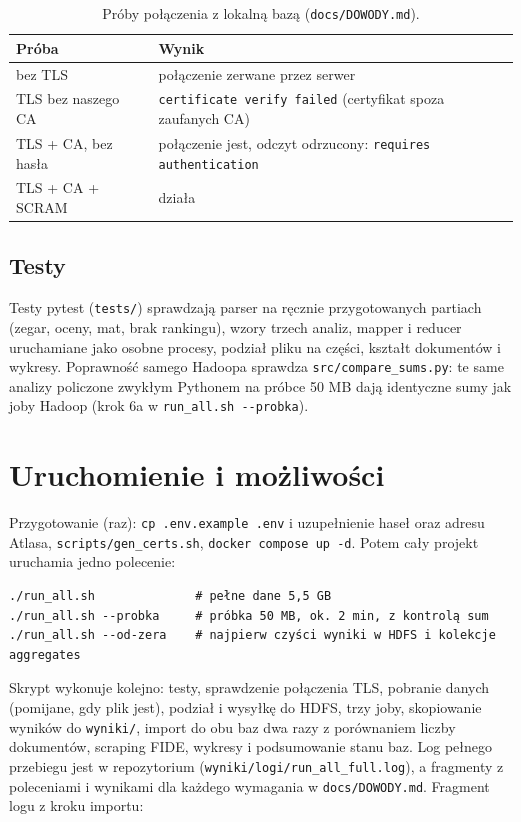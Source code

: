 \documentclass[11pt,a4paper]{article}
\newcommand{\kod}[1]{\texttt{#1}}
\begin{document}
\begin{table}[H]
\centering
\caption{Próby połączenia z lokalną bazą (\kod{docs/DOWODY.md}).}\label{tab:tls}
\small
\begin{tabular}{ll}
\toprule
Próba & Wynik \\
\midrule
bez TLS & połączenie zerwane przez serwer \\
TLS bez naszego CA & \kod{certificate verify failed} (certyfikat spoza zaufanych CA) \\
TLS + CA, bez hasła & połączenie jest, odczyt odrzucony: \kod{requires authentication} \\
TLS + CA + SCRAM & działa \\
\bottomrule
\end{tabular}
\end{table}

\subsection{Testy}
Testy pytest (\kod{tests/}) sprawdzają parser na ręcznie przygotowanych partiach (zegar, oceny, mat, brak rankingu), wzory trzech analiz, mapper i reducer uruchamiane jako osobne procesy, podział pliku na części, kształt dokumentów i wykresy. Poprawność samego Hadoopa sprawdza \kod{src/compare\_sums.py}: te same analizy policzone zwykłym Pythonem na próbce 50 MB dają identyczne sumy jak joby Hadoop (krok 6a w \kod{run\_all.sh -{}-probka}).

\section{Uruchomienie i możliwości}\label{sec:uruchomienie}
Przygotowanie (raz): \kod{cp .env.example .env} i uzupełnienie haseł oraz adresu Atlasa, \kod{scripts/gen\_certs.sh}, \kod{docker compose up -d}. Potem cały projekt uruchamia jedno polecenie:
\begin{lstlisting}[style=shc]
./run_all.sh              # pełne dane 5,5 GB
./run_all.sh --probka     # próbka 50 MB, ok. 2 min, z kontrolą sum
./run_all.sh --od-zera    # najpierw czyści wyniki w HDFS i kolekcje aggregates
\end{lstlisting}
Skrypt wykonuje kolejno: testy, sprawdzenie połączenia TLS, pobranie danych (pomijane, gdy plik jest), podział i wysyłkę do HDFS, trzy joby, skopiowanie wyników do \kod{wyniki/}, import do obu baz dwa razy z porównaniem liczby dokumentów, scraping FIDE, wykresy i podsumowanie stanu baz. Log pełnego przebiegu jest w repozytorium (\kod{wyniki/logi/run\_all\_full.log}), a fragmenty z poleceniami i wynikami dla każdego wymagania w \kod{docs/DOWODY.md}. Fragment logu z kroku importu:

\end{document}
